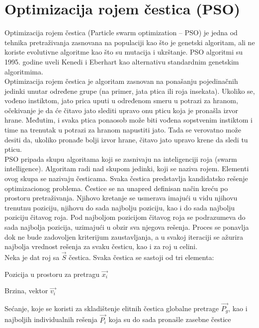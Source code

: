 \documentclass{article}
\begin{document}
\section{Optimizacija rojem čestica (PSO)}
\label{sec:pso}

Optimizacija rojem čestica (Particle swarm optimization – PSO) je jedna od tehnika pretraživanja zasnovana na populaciji kao što je genetski algoritam, ali ne koriste evolutivne algoritme kao što su mutacija i ukrštanje.
PSO algoritmi su 1995. godine uveli Kenedi i Eberhart kao alternativu standardnim genetskim algoritmima. \\

Optimizacija rojem čestica je algoritam zasnovan na ponašanju pojedinačnih jedinki unutar određene grupe (na primer, jata ptica ili roja insekata). Ukoliko se, vođeno instiktom, jato prica uputi u određenom smeru u potrazi za hranom, očekivanje je da će čitavo jato slediti upravo onu pticu koja je pronašla izvor hrane. Međutim, i svaka ptica ponaosob može biti vođena sopstvenim instiktom i time na trenutak u potrazi za hranom napustiti jato. Tada se verovatno može desiti da, ukoliko pronađe bolji izvor hrane, čitavo jato upravo krene da sledi tu pticu. \\

PSO pripada skupu algoritama koji se zasnivaju na inteligenciji roja (swarm intelligence). Algoritam radi nad skupom jedinki, koji se naziva rojem. Elementi ovog skupa se nazivaju česticama. 
Svaka čestica predstavlja kandidatsko rešenje optimizacionog problema. Čestice se na unapred definisan način kreću po prostoru pretraživanja. Njihovo kretanje se usmerava imajući u vidu njihovu trenutnu poziciju, njihovu do sada najbolju poziciju, kao i do sada najbolju poziciju čitavog roja. Pod najboljom pozicijom čitavog roja se podrazumeva do sada najbolja pozicija, uzimajući u obzir sva njegova rešenja. Proces se ponavlja dok ne bude zadovoljen kriterijum zaustavljanja, a u svakoj iteraciji se ažurira najbolja vrednost rešenja za svaku česticu, kao i za roj u celini. \\

Neka je dat roj sa $\vec{S}$ čestica. Svaka čestica se sastoji od tri elementa:
\begin{list}{•}{}
	\item Pozicija u prostoru za pretragu $\vec{x_i}$
	\item Brzina, vektor $\vec{v_i}$
	\item Sećanje, koje se koristi za skladištenje elitnih čestica globalne pretrage $\vec{P_g}$, kao i najboljih individualnih rešenja $\vec{P_i}$ koja su do sada pronašle zasebne čestice\\
\end{list}
\end{document}
